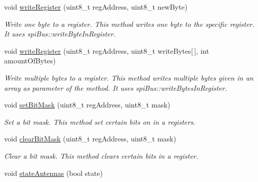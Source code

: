 \begin{DoxyCompactItemize}
\mbox{\label{classMFRC522_a4998d808c32388f57089b5b1f6affea5}} 
void \hyperlink{classMFRC522_a4998d808c32388f57089b5b1f6affea5}{write\+Register} (uint8\+\_\+t reg\+Address, uint8\+\_\+t new\+Byte)
\begin{DoxyCompactList}\small\item\em Write one byte to a register.  This method writes one byte to the specific register. It uses spi\+Bus\+::write\+Byte\+In\+Register. \end{DoxyCompactList}\item 
\mbox{\label{classMFRC522_a302848dc6302753cf8a188b1f3c28ce1}} 
void \hyperlink{classMFRC522_a302848dc6302753cf8a188b1f3c28ce1}{write\+Register} (uint8\+\_\+t reg\+Address, uint8\+\_\+t write\+Bytes\mbox{[}$\,$\mbox{]}, int amount\+Of\+Bytes)
\begin{DoxyCompactList}\small\item\em Write multiple bytes to a register.  This method writes multiple bytes given in an array as parameter of the method. It uses spi\+Bus\+::write\+Bytes\+In\+Register. \end{DoxyCompactList}\item 
\mbox{\label{classMFRC522_a398266ee566ff9a51e6d814dd19cf3fd}} 
void \hyperlink{classMFRC522_a398266ee566ff9a51e6d814dd19cf3fd}{set\+Bit\+Mask} (uint8\+\_\+t reg\+Address, uint8\+\_\+t mask)
\begin{DoxyCompactList}\small\item\em Set a bit mask.  This method set certain bits on in a registers. \end{DoxyCompactList}\item 
\mbox{\label{classMFRC522_ab3127828649757df8bdf34b3f329ee8a}} 
void \hyperlink{classMFRC522_ab3127828649757df8bdf34b3f329ee8a}{clear\+Bit\+Mask} (uint8\+\_\+t reg\+Address, uint8\+\_\+t mask)
\begin{DoxyCompactList}\small\item\em Clear a bit mask.  This method clears certain bits in a register. \end{DoxyCompactList}\item 
\mbox{\label{classMFRC522_a7a9e65b7320721d0e823fd610cb22a84}} 
void \hyperlink{classMFRC522_a7a9e65b7320721d0e823fd610cb22a84}{state\+Antennas} (bool state)

\end{DoxyCompactItemize}
